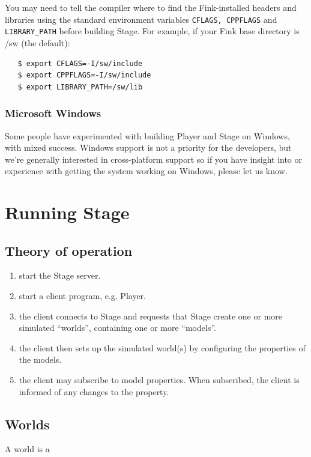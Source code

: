 \documentclass[letter,11pt,twoside]{report}
\begin{document}
You may need to tell the compiler where to find the Fink-installed
headers and libraries using the standard environment variables
\verb+CFLAGS, CPPFLAGS+ and \verb+LIBRARY_PATH+ before building
Stage. For example, if your Fink base directory is /sw (the default):

\begin{verbatim}
   $ export CFLAGS=-I/sw/include
   $ export CPPFLAGS=-I/sw/include
   $ export LIBRARY_PATH=/sw/lib
\end{verbatim}

\subsubsection{Microsoft Windows}
Some people have experimented with building Player and Stage on
Windows, with mixed success. Windows support is not a priority for the
developers, but we're generally interested in cross-platform support
so if you have insight into or experience with getting the system
working on Windows, please let us know.

\section{Running Stage}

\subsection{Theory of operation}

\begin{enumerate}
\item start the Stage server.
\item start a client program, e.g. Player.
\item the client connects to Stage and requests that Stage create one
or more simulated ``worlds'', containing one or more ``models''.
\item the client then sets up the simulated world(s) by configuring
the properties of the models.
\item the client may subscribe to model properties. When subscribed,
the client is informed of any changes to the property.
\end{enumerate}


\subsection{Worlds}

A world is a 
\end{document}
